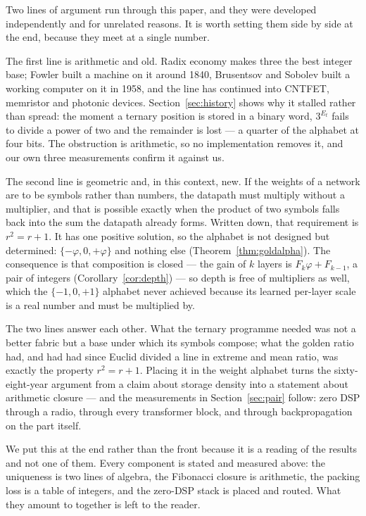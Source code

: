 
\label{sec:completes}

Two lines of argument run through this paper, and they were developed
independently and for unrelated reasons. It is worth setting them side by side at
the end, because they meet at a single number.

The first line is arithmetic and old. Radix economy makes three the best integer
base; Fowler built a machine on it around 1840, Brusentsov and Sobolev built a
working computer on it in 1958, and the line has continued into CNTFET, memristor
and photonic devices. Section~\ref{sec:history} shows why it stalled rather than
spread: the moment a ternary position is stored in a binary word, $3^{E_t}$ fails
to divide a power of two and the remainder is lost --- a quarter of the alphabet
at four bits. The obstruction is arithmetic, so no implementation removes it, and
our own three measurements confirm it against us.

The second line is geometric and, in this context, new. If the weights of a
network are to be symbols rather than numbers, the datapath must multiply without
a multiplier, and that is possible exactly when the product of two symbols falls
back into the sum the datapath already forms. Written down, that requirement is
$r^2 = r + 1$. It has one positive solution, so the alphabet is not designed but
determined: $\{-\varphi, 0, +\varphi\}$ and nothing else
(Theorem~\ref{thm:goldalpha}). The consequence is that composition is closed ---
the gain of $k$ layers is $F_k\varphi + F_{k-1}$, a pair of integers
(Corollary~\ref{cor:depth}) --- so depth is free of multipliers as well, which the
$\{-1,0,+1\}$ alphabet never achieved because its learned per-layer scale is a
real number and must be multiplied by.

The two lines answer each other. What the ternary programme needed was not a
better fabric but a base under which its symbols compose; what the golden ratio
had, and had had since Euclid divided a line in extreme and mean ratio, was
exactly the property $r^2 = r + 1$. Placing it in the weight alphabet turns the
sixty-eight-year argument from a claim about storage density into a statement
about arithmetic closure --- and the measurements in Section~\ref{sec:pair}
follow: zero DSP through a radio, through every transformer block, and through
backpropagation on the part itself.

We put this at the end rather than the front because it is a reading of the
results and not one of them. Every component is stated and measured above:
the uniqueness is two lines of algebra, the Fibonacci closure is arithmetic, the
packing loss is a table of integers, and the zero-DSP stack is placed and routed.
What they amount to together is left to the reader.



